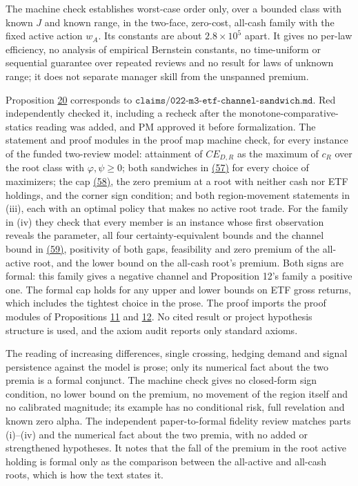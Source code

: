 \documentclass[11pt]{article}
\begin{document}
The machine check establishes worst-case order only, over a
bounded class with known \(J\) and known range, in the
two-face, zero-cost, all-cash family with the fixed active
action \(w_A\). Its constants are about \(2.8\times10^5\)
apart. It gives no per-law efficiency, no analysis of
empirical Bernstein constants, no time-uniform or sequential
guarantee over repeated reviews and no result for laws of
unknown range; it does not separate manager skill from the
unspanned premium.

Proposition \hyperref[res:Proposition-20]{20} corresponds to
\(\texttt{claims/022-m3-etf-channel-sandwich.md}\). Red
independently checked it, including a recheck after the
monotone-comparative-statics reading was added, and PM approved
it before formalization. The statement and proof modules in the
proof map machine check, for every instance of the funded
two-review model: attainment of \(CE_{D,R}\) as the maximum of
\(c_R\) over the root class with \(\varphi,\psi\geq0\); both
sandwiches in \hyperref[eq:57]{(57)} for every choice of maximizers; the cap
\hyperref[eq:58]{(58)}, the zero premium at a root with neither cash nor ETF
holdings, and the corner sign condition; and both
region-movement statements in (iii), each with an optimal
policy that makes no active root trade. For the family in (iv)
they check that every member is an instance whose first
observation reveals the parameter, all four certainty-equivalent
bounds and the channel bound in \hyperref[eq:59]{(59)}, positivity of both gaps,
feasibility and zero premium of the all-active root, and the
lower bound on the all-cash root's premium. Both signs are
formal: this family gives a negative channel and Proposition
12's family a positive one. The formal cap holds for any upper
and lower bounds on ETF gross returns, which includes the
tightest choice in the prose. The proof imports the proof
modules of Propositions \hyperref[res:Proposition-11]{11} and \hyperref[res:Proposition-12]{12}. No cited result or project
hypothesis structure is used, and the axiom audit reports only
standard axioms.

The reading of increasing differences, single crossing, hedging
demand and signal persistence against the model is prose; only
its numerical fact about the two premia is a formal conjunct.
The machine check gives no closed-form sign condition, no lower
bound on the premium, no movement of the region itself and no
calibrated magnitude; its example has no conditional risk, full
revelation and known zero alpha. The independent paper-to-formal
fidelity review matches parts (i)--(iv) and the numerical fact
about the two premia, with no added or strengthened hypotheses.
It notes that the fall of the premium in the root active holding
is formal only as the comparison between the all-active and
all-cash roots, which is how the text states it.
\end{document}
